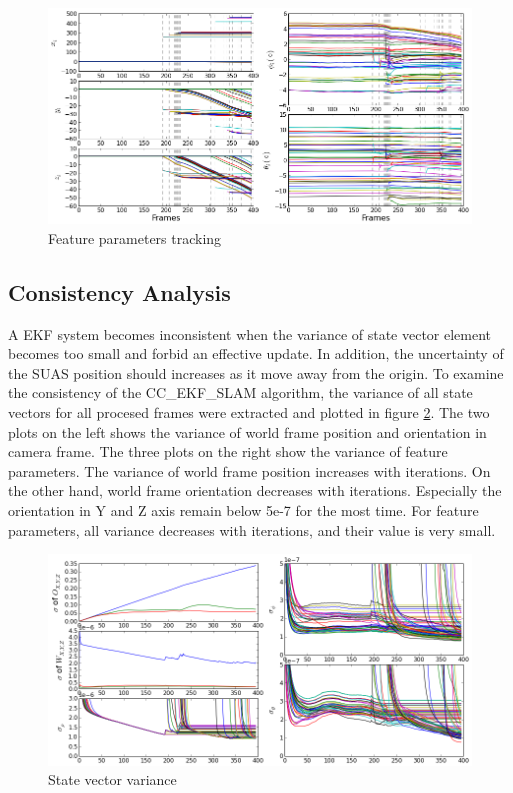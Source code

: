 \begin{figure}[h]
\centering
\includegraphics[width=14cm, keepaspectratio=true]
{./Figures/fltfig/cut1/Figure20.png}
\caption{Feature parameters tracking}
\label{fltfig:2}
\end{figure}

\subsection{Consistency Analysis}
A EKF system becomes inconsistent when the variance of state vector
element becomes too small and forbid an effective update. In addition,
the uncertainty of the SUAS position should increases as it move away
from the origin. To examine the consistency of the CC\_EKF\_SLAM
algorithm, the variance of all state vectors for all procesed frames
were extracted and plotted in figure \ref{fltfig:3}. The two plots on
the left shows the variance of world frame position and orientation in
camera frame. The three plots on the right show the variance of
feature parameters. The variance of world frame position increases
with iterations. On the other hand, world frame orientation decreases
with iterations. Especially the orientation in Y and Z axis remain
below 5e-7 for the most time. For feature parameters, all variance
decreases with iterations, and their value is very small. 
\begin{figure}[h]
\centering
\includegraphics[width=12cm, keepaspectratio=true]
{./Figures/fltfig/cut1/Figure40.png}
\caption{State vector variance}
\label{fltfig:3}
\end{figure}


